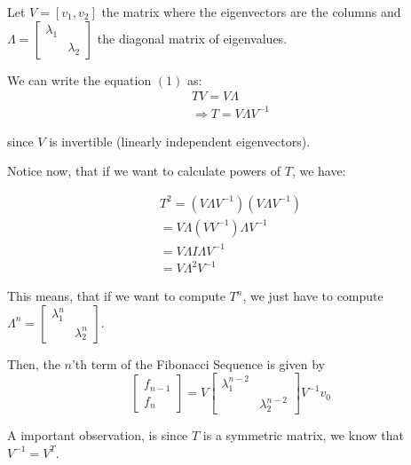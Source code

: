 \documentclass{article}
\begin{document}
Let $V = [v_1 , v_2]$ the matrix where the eigenvectors are the columns and $\Lambda = \begin{bmatrix}
    \lambda_1 & \\
    & \lambda_2
\end{bmatrix}$ the diagonal matrix of eigenvalues.

We can write the equation $(1)$ as:
\begin{equation*}
    \begin{aligned}
        TV = V\Lambda\\
        \Rightarrow T = V \Lambda V^{-1}
    \end{aligned}
\end{equation*}

since $V$ is invertible (linearly independent eigenvectors).

Notice now, that if we want to calculate powers of $T$, we have:

\begin{equation*}
    \begin{aligned}
        T^2 = (V\Lambda V^{-1})(V\Lambda V^{-1})\\
        = V\Lambda (VV^{-1})\Lambda V^{-1}\\
        = V \Lambda I \Lambda V^{-1} \\
        =V \Lambda^2 V^{-1}
    \end{aligned}
\end{equation*}

This means, that if we want to compute $T^n$, we just have to compute \\
$\Lambda ^n = \begin{bmatrix}
    \lambda_1 ^n & \\
    & \lambda_2 ^n
\end{bmatrix}$.

Then, the $n$'th term of the Fibonacci Sequence is given by
\begin{equation*}
    \begin{bmatrix}
        f_{n - 1}\\
        f_n
    \end{bmatrix} = V \begin{bmatrix}
        \lambda_1 ^{n - 2} & \\
    & \lambda_2 ^{n - 2}
    \end{bmatrix}V^{-1}v_0
\end{equation*}

A important observation, is since $T$ is a symmetric matrix, we know that $V^{-1} = V^T$.
\end{document}
